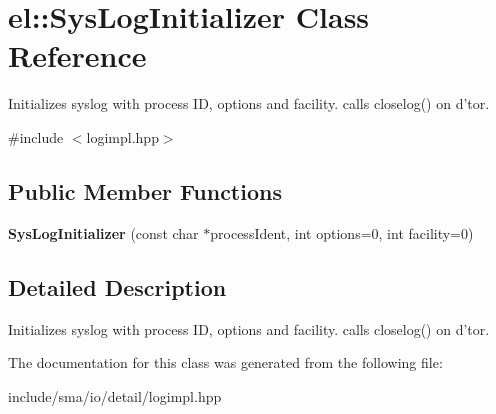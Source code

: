 \hypertarget{classel_1_1SysLogInitializer}{\section{el\-:\-:Sys\-Log\-Initializer Class Reference}
\label{classel_1_1SysLogInitializer}
}


Initializes syslog with process I\-D, options and facility. calls closelog() on d'tor.  




{\ttfamily \#include $<$logimpl.\-hpp$>$}

\subsection*{Public Member Functions}
\begin{DoxyCompactItemize}
\item 
\hypertarget{classel_1_1SysLogInitializer_aae71ee83f45c4cf770fbc6c6e87d9406}{{\bfseries Sys\-Log\-Initializer} (const char $\ast$process\-Ident, int options=0, int facility=0)}\label{classel_1_1SysLogInitializer_aae71ee83f45c4cf770fbc6c6e87d9406}

\end{DoxyCompactItemize}


\subsection{Detailed Description}
Initializes syslog with process I\-D, options and facility. calls closelog() on d'tor. 

The documentation for this class was generated from the following file\-:\begin{DoxyCompactItemize}
\item 
include/sma/io/detail/logimpl.\-hpp\end{DoxyCompactItemize}
